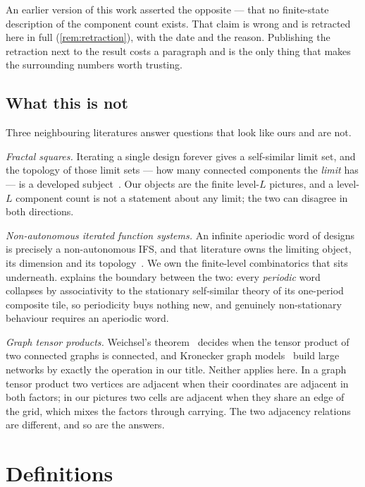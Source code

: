 \documentclass[11pt]{amsart}
\theoremstyle{definition}
\theoremstyle{remark}
\begin{document}
An earlier version of this work asserted the opposite --- that no finite-state description of the component count exists. That claim is wrong and is retracted here in full (\cref{rem:retraction}), with the date and the reason. Publishing the retraction next to the result costs a paragraph and is the only thing that makes the surrounding numbers worth trusting.

\subsection*{What this is not}

Three neighbouring literatures answer questions that look like ours and are not.

\emph{Fractal squares.} Iterating a single design forever gives a self-similar limit set, and the topology of those limit sets --- how many connected components the \emph{limit} has --- is a developed subject~\cite{fractalsquares}. Our objects are the finite level-$L$ pictures, and a level-$L$ component count is not a statement about any limit; the two can disagree in both directions.

\emph{Non-autonomous iterated function systems.} An infinite aperiodic word of designs is precisely a non-autonomous IFS, and that literature owns the limiting object, its dimension and its topology~\cite{nonautoifs,nonautotop}. We own the finite-level combinatorics that sits underneath.  explains the boundary between the two: every \emph{periodic} word collapses by associativity to the stationary self-similar theory of its one-period composite tile, so periodicity buys nothing new, and genuinely non-stationary behaviour requires an aperiodic word.

\emph{Graph tensor products.} Weichsel's theorem~\cite{weichsel} decides when the tensor product of two connected graphs is connected, and Kronecker graph models~\cite{kroneckergraphs} build large networks by exactly the operation in our title. Neither applies here. In a graph tensor product two vertices are adjacent when their coordinates are adjacent in both factors; in our pictures two cells are adjacent when they share an edge of the grid, which mixes the factors through carrying. The two adjacency relations are different, and so are the answers.

\section{Definitions}
\label{sec:def}
\end{document}
